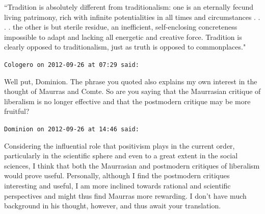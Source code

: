 \begin{footnotesize}
\begin{sffamily}
``Tradition is absolutely different from traditionalism: one is an eternally fecund living patrimony, rich with infinite potentialities in all times and circumstances . . . . the other is but sterile residue, an inefficient, self-enclosing concreteness impossible to adapt and lacking all energetic and creative force. Tradition is clearly opposed to traditionalism, just as truth is opposed to commonplaces."


\hfill

\texttt{Cologero on 2012-09-26 at 07:29 said: }

Well put, Dominion. The phrase you quoted also explains my own interest in the thought of Maurras and Comte. So are you saying that the Maurrasian critique of liberalism is no longer effective and that the postmodern critique may be more fruitful?


\hfill

\texttt{Dominion on 2012-09-26 at 14:46 said: }

Considering the influential role that positivism plays in the current order, particularly in the scientific sphere and even to a great extent in the social sciences, I think that both the Maurrasian and postmodern critiques of liberalism would prove useful. Personally, although I find the postmodern critiques interesting and useful, I am more inclined towards rational and scientific perspectives and might thus find Maurras more rewarding. I don't have much background in his thought, however, and thus await your translation.


\end{sffamily}\end{footnotesize}
